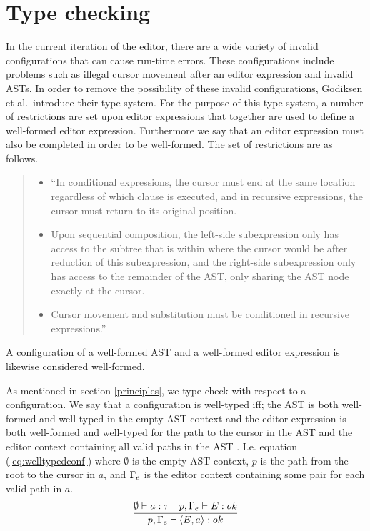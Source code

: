 \section{Type checking}
\label{type-checking}
In the current iteration of the editor, there are a wide variety of invalid
configurations that can cause run-time errors. These configurations include
problems such as illegal cursor movement after an editor expression and invalid
ASTs. In order to remove the possibility of these invalid configurations,
Godiksen et al.\pepm ~introduce their type system. For the purpose of this type
system, a number of restrictions are set upon editor expressions that together
are used to define a well-formed editor expression. Furthermore we say that an
editor expression must also be completed in order to be well-formed. The set of
restrictions are as follows.
\begin{quote}
    \begin{itemize}
        \item ``In conditional expressions, the cursor must end at the same
              location regardless of which clause is executed, and in
              recursive expressions, the cursor must return to its original
              position.
        \item Upon sequential composition, the left-side subexpression
              only has access to the subtree that is within where the
              cursor would be after reduction of this subexpression,
              and the right-side subexpression only has access to the
              remainder of the AST, only sharing the AST node exactly
              at the cursor.
        \item Cursor movement and substitution must be conditioned in
              recursive expressions.''\pepm
      \end{itemize}
\end{quote}


A configuration of a well-formed AST and a well-formed editor expression is
likewise considered well-formed.

As mentioned in section \ref{principles}, we type check with respect to a
configuration. We say that a configuration is well-typed iff; the AST is both
well-formed and well-typed in the empty AST context and the editor expression
is both well-formed and well-typed for the path to the cursor in the AST and
the editor context containing all valid paths in the AST \pepm. I.e. equation
(\ref{eq:welltypedconf}) where $\emptyset$ is the empty AST context, $p$ is the
path from the root to the cursor in $a$, and $\Gamma_{e}$ is the editor context
containing some pair for each valid path in $a$. 
\begin{equation}\label{eq:welltypedconf}
  \frac{\emptyset \vdash a : \tau \quad p,\Gamma_{e} \vdash E : ok} {p,\Gamma_{e} \vdash \langle E,a \rangle : ok}\\ 
\end{equation}

